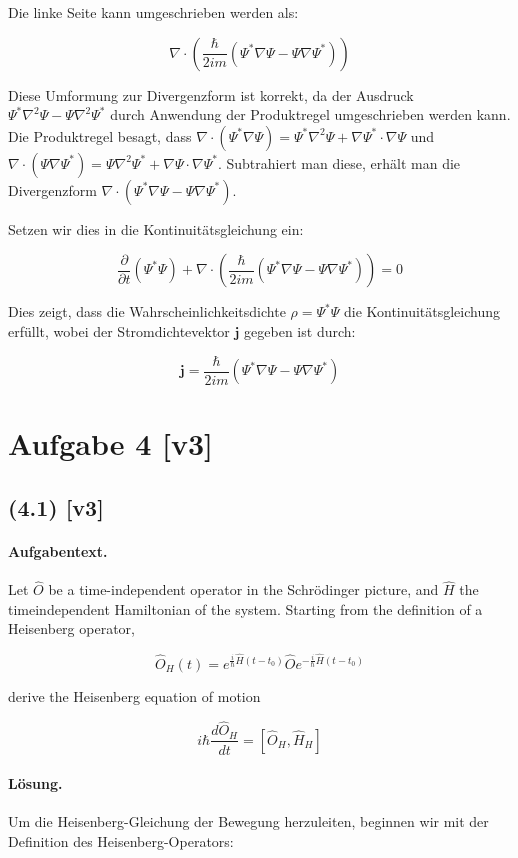 \documentclass[11pt,a4paper]{article}
\begin{document}
Die linke Seite kann umgeschrieben werden als:

\[
\nabla \cdot \left(\frac{\hbar}{2 i m} \left(\Psi^* \nabla \Psi - \Psi \nabla \Psi^*\right)\right)
\]

Diese Umformung zur Divergenzform ist korrekt, da der Ausdruck \(\Psi^* \nabla^2 \Psi - \Psi \nabla^2 \Psi^*\) durch Anwendung der Produktregel umgeschrieben werden kann. Die Produktregel besagt, dass \(\nabla \cdot (\Psi^* \nabla \Psi) = \Psi^* \nabla^2 \Psi + \nabla \Psi^* \cdot \nabla \Psi\) und \(\nabla \cdot (\Psi \nabla \Psi^*) = \Psi \nabla^2 \Psi^* + \nabla \Psi \cdot \nabla \Psi^*\). Subtrahiert man diese, erhält man die Divergenzform \(\nabla \cdot (\Psi^* \nabla \Psi - \Psi \nabla \Psi^*)\).

Setzen wir dies in die Kontinuitätsgleichung ein:

\[
\frac{\partial}{\partial t} (\Psi^* \Psi) + \nabla \cdot \left(\frac{\hbar}{2 i m} \left(\Psi^* \nabla \Psi - \Psi \nabla \Psi^*\right)\right) = 0
\]

Dies zeigt, dass die Wahrscheinlichkeitsdichte \(\rho = \Psi^* \Psi\) die Kontinuitätsgleichung erfüllt, wobei der Stromdichtevektor \(\mathbf{j}\) gegeben ist durch:

\[
\mathbf{j} = \frac{\hbar}{2 i m} \left(\Psi^* \nabla \Psi - \Psi \nabla \Psi^*\right)
\]

\section*{Aufgabe 4 [v3]}
\subsection*{(4.1) [v3]}
\paragraph{Aufgabentext.}
Let $\hat{O}$ be a time-independent operator in the Schrödinger picture, and $\hat{H}$ the timeindependent Hamiltonian of the system. Starting from the definition of a Heisenberg operator,

$$
\hat{O}_H(t)=e^{\frac{i}{\hbar} \hat{H}\left(t-t_0\right)} \hat{O} e^{-\frac{i}{\hbar} \hat{H}\left(t-t_0\right)}
$$

derive the Heisenberg equation of motion

$$
i \hbar \frac{d \hat{O}_H}{d t}=\left[\hat{O}_H, \hat{H}_H\right]
$$

\paragraph{Lösung.}
Um die Heisenberg-Gleichung der Bewegung herzuleiten, beginnen wir mit der Definition des Heisenberg-Operators:
\end{document}
